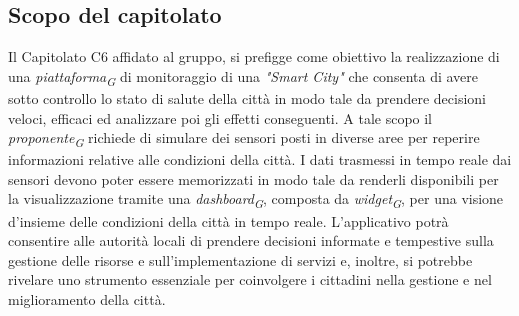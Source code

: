 \subsection{Scopo del capitolato}
    Il Capitolato C6 affidato al gruppo, si prefigge come obiettivo la realizzazione di una \textit{piattaforma}\textsubscript{\textit{G}} di monitoraggio di una \textit{"Smart City"} che consenta di avere sotto controllo lo stato di salute della città in modo tale da prendere decisioni veloci, efficaci ed analizzare poi gli effetti conseguenti.
    A tale scopo il \textit{proponente}\textsubscript{\textit{G}} richiede di simulare dei sensori posti in diverse aree per reperire informazioni relative alle condizioni della città.  
    I dati trasmessi in tempo reale dai sensori devono poter essere memorizzati in modo tale da renderli disponibili per la visualizzazione tramite una \textit{dashboard}\textsubscript{\textit{G}}, composta da \textit{widget}\textsubscript{\textit{G}}, per una visione d'insieme delle condizioni della città in tempo reale.  
    L'applicativo potrà consentire alle autorità locali di prendere decisioni informate e tempestive sulla gestione delle risorse e sull'implementazione di servizi e, inoltre, si potrebbe rivelare uno strumento essenziale per coinvolgere i cittadini nella gestione e nel miglioramento della città.  

